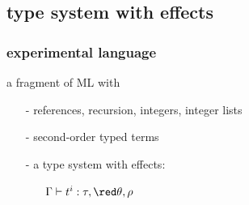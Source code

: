 \subsection*{type system with effects}
\begin{frame}[fragile]
\frametitle{experimental language}
a fragment of ML with
\begin{itemize}
	\item[-] references, recursion, integers, integer lists
	\item[-] {\red second-order} typed terms\\[0.5em]
		\begin{itemize}	
		\end{itemize}
		 \pause
	\item[-] a type system {\red with effects}:\\[0.5em]
		\begin{itemize}
			\item[] \qquad $\Gamma \vdash t^{i}: \tau, {\red \theta, \rho} $
		\end{itemize}
\end{itemize}
\end{frame}


